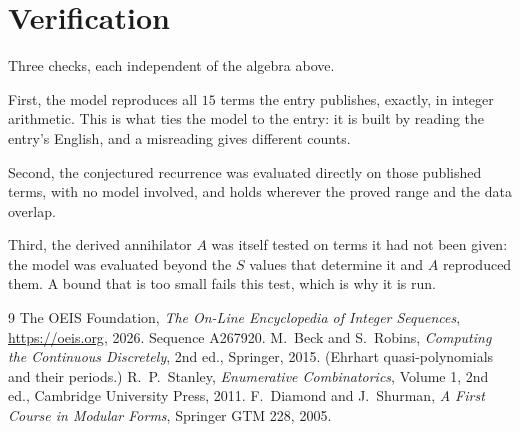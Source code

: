 \documentclass[11pt,a4paper]{article}
\theoremstyle{plain}
\theoremstyle{definition}
\begin{document}
\section{Verification}

Three checks, each independent of the algebra above.

First, the model reproduces all $15$ terms the entry publishes, exactly, in integer
arithmetic. This is what ties the model to the entry: it is built by reading the entry's
English, and a misreading gives different counts.

Second, the conjectured recurrence was evaluated directly on those published terms, with no
model involved, and holds wherever the proved range and the data overlap.

Third, the derived annihilator $A$ was itself tested on terms it had not been given: the model
was evaluated beyond the $S$ values that determine it and $A$ reproduced them. A bound that is
too small fails this test, which is why it is run.

\begin{thebibliography}{9}
 The OEIS Foundation, \emph{The On-Line Encyclopedia of Integer
Sequences}, \url{https://oeis.org}, 2026. Sequence A267920.
 M.~Beck and S.~Robins, \emph{Computing the Continuous Discretely},
2nd ed., Springer, 2015. (Ehrhart quasi-polynomials and their periods.)
 R.~P.~Stanley, \emph{Enumerative Combinatorics}, Volume 1, 2nd ed.,
Cambridge University Press, 2011.
 F.~Diamond and J.~Shurman, \emph{A First Course in Modular Forms},
Springer GTM 228, 2005.
\end{thebibliography}
\end{document}

